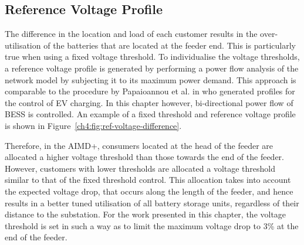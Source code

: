 \subsection{Reference Voltage Profile}

The difference in the location and load of each customer results in the over-utilisation of the batteries that are located at the feeder end.
This is particularly true when using a fixed voltage threshold.
To individualise the voltage thresholds, a reference voltage profile is generated by performing a power flow analysis of the network model by subjecting it to its maximum power demand.
This approach is comparable to the procedure by Papaioannou et al. in \cite{Papaioannou2015} who generated profiles for the control of EV charging.
In this chapter however, bi-directional power flow of BESS is controlled.
An example of a fixed threshold and reference voltage profile is shown in Figure~\ref{ch4:fig:ref-voltage-difference}.



Therefore, in the AIMD+, consumers located at the head of the feeder are allocated a higher voltage threshold than those towards the end of the feeder.
However, customers with lower thresholds are allocated a voltage threshold similar to that of the fixed threshold control.
This allocation takes into account the expected voltage drop, that occurs along the length of the feeder, and hence results in a better tuned utilisation of all battery storage units, regardless of their distance to the substation.
For the work presented in this chapter, the voltage threshold is set in such a way as to limit the maximum voltage drop to 3\% at the end of the feeder.


